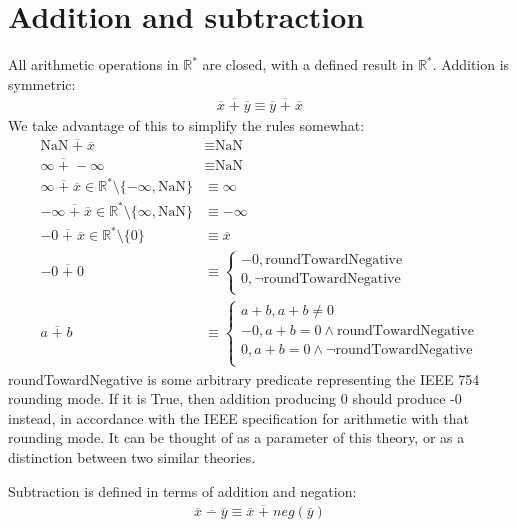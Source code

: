 \documentclass[letterpaper,10pt]{article}
\newcommand{\NaN}{\text{NaN}}
\begin{document}
\section{Addition and subtraction}

 All arithmetic operations in $\mathbb{R}^*$ are closed, with a defined result in $\mathbb{R}^*$. Addition is symmetric:
\begin{align}
 \overline{x} \;\overline{+}\; \overline{y} \equiv \overline{y} \;\overline{+}\; \overline{x}
\end{align}
 We take advantage of this to simplify the rules somewhat:
\begin{align}
 \NaN \;\overline{+}\; \overline{x} &\equiv \NaN \\
 \infty \;\overline{+}\; -\infty &\equiv \NaN \\
 \infty \;\overline{+}\; \overline{x} \in \mathbb{R}^* \setminus \{-\infty, \NaN\} &\equiv \infty \\
 -\infty \;\overline{+}\; \overline{x} \in \mathbb{R}^* \setminus \{\infty, \NaN\} &\equiv -\infty \\
 -0 \;\overline{+}\; \overline{x} \in \mathbb{R}^* \setminus \{0\} &\equiv \overline{x} \\
 -0 \;\overline{+}\; 0 &\equiv
 \begin{cases}
  -0, \text{roundTowardNegative} \\
  0, \lnot \text{roundTowardNegative} \\
 \end{cases}\\
 a \;\overline{+}\; b &\equiv
 \begin{cases}
  a + b, a + b \not= 0 \\
  -0, a + b = 0 \land \text{roundTowardNegative} \\
  0, a + b = 0 \land \lnot \text{roundTowardNegative} \\
 \end{cases}
\end{align}
 roundTowardNegative is some arbitrary predicate representing the IEEE 754 rounding mode. If it is True, then addition producing 0 should produce -0 instead, in accordance with the IEEE specification for arithmetic with that rounding mode. It can be thought of as a parameter of this theory, or as a distinction between two similar theories.

 Subtraction is defined in terms of addition and negation:
\begin{align}
 \overline{x} \;\overline{-}\; \overline{y} \equiv \overline{x} \;\overline{+}\; neg(\overline{y})
\end{align}
\end{document}
